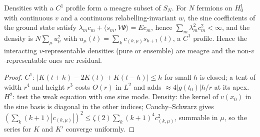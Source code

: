 \begin{theorem}
  \label{thm:line_fer_meagre}
  \leanok
  Densities with a $C^1$ profile form a meagre subset of $S_N$. For $N$ fermions on $H^1_0$ with continuous $v$ and a
  continuous relabelling-invariant $w$, the sine coefficients of the ground state satisfy
  $\lambda_mc_m+\langle s_m,V\Psi\rangle=Ec_m$, hence $\sum_m\lambda_m^2c_m^2<\infty$, and the density is
  $N\sum_\mu u_\mu^2$ with $u_\mu(t)=\sum_kc_{(k,\mu)}s_{k+1}(t)$, a $C^1$ profile. Hence the interacting
  $v$-representable densities (pure or ensemble) are meagre and the non-$v$-representable ones are residual.
\end{theorem}
\begin{proof}
  \leanok
  $C^1$: $|K(t+h)-2K(t)+K(t-h)|\le h$ for small $h$ is closed; a tent of width $r^4$ and height $r^3$ costs $O(r)$ in
  $L^2$ and adds $\approx4|g(t_0)|h/r$ at its apex. $H^2$: test the weak equation with one sine mode. Density: the
  kernel of $v(x_0)$ in the sine basis is diagonal in the other indices; Cauchy--Schwarz gives
  $(\sum_k(k+1)|c_{(k,\mu)}|)^2\le\zeta(2)\sum_k(k+1)^4c_{(k,\mu)}^2$, summable in $\mu$, so the series for $K$ and $K'$
  converge uniformly.
\end{proof}

